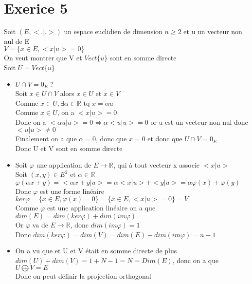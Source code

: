 \documentclass{article}
\author{Frederic Becerril}
\begin{document}
\part*{Exerice 5}

Soit $(E, <.|.>)$ un espace euclidien de dimension $n \geq 2$ et u un vecteur non nul de E\\
$V = \{x \in E, <x|u> = 0\}$\\
On veut montrer que V et $Vect\{u\}$ sont en somme directe\\
Soit $U = Vect\{u\}$
\begin{itemize}
    \item $U \cap V = 0_E$ ?\\
Soit $x \in U \cap V$ alors $x \in U$ et $x \in V$\\
Comme $x \in U, \exists \alpha \in \mathbb{R} \mbox{ tq } x = \alpha u$\\
Comme $x \in U$, on a $<x|u> = 0$\\
Donc on a $<\alpha u | u> = 0 \Leftrightarrow \alpha <u | u> = 0$ or u est un vecteur non nul donc $<u|u> \neq 0$\\
Finalement on a que $\alpha = 0$, donc que $x = 0$ et donc que $U \cap V = 0_E$\\
Donc U et V sont en somme directe\\
    \item Soit $\varphi$ une application de $E \rightarrow \mathbb{R}$, qui à tout vecteur x associe $<x|u>$\\
Soit $(x, y) \in E^2$ et $\alpha \in \mathbb{R}$\\
$\varphi(\alpha x + y) = <\alpha x + y | u> = \alpha <x | u> + <y | u> = \alpha \varphi(x) + \varphi(y)$\\
Donc $\varphi$ est une forme linéaire\\
$ker \varphi = \{x \in E, \varphi(x) = 0\} = \{x \in E, <x|u> = 0\} = V$\\
Comme $\varphi$ est une application linéaire on a que $dim(E) = dim(ker\varphi) + dim(im\varphi)$\\
Or $\varphi$ va de $E \rightarrow \mathbb{R}$, donc $dim(im \varphi) = 1$\\
Donc $dim(ker \varphi) = dim(V) = dim(E) - dim(im \varphi) = n - 1$
    \item On a vu que et U et V était en somme directe de plus $dim(U) + dim(V) = 1 + N - 1 = N = Dim(E)$, donc on a que $U \bigoplus V = E$\\
Donc on peut définir la projection orthogonal\\

\end{itemize}
\end{document}
